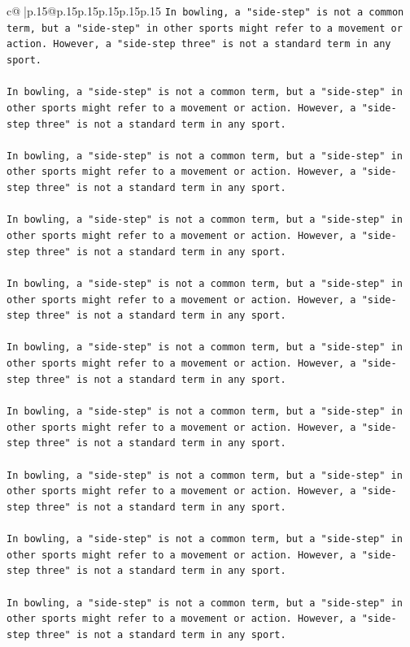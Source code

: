 \documentclass{article}
\begin{document}
{\begin{supertabular}{c@{$\;$}|p{.15\linewidth}@{}p{.15\linewidth}p{.15\linewidth}p{.15\linewidth}p{.15\linewidth}p{.15\linewidth}}
{{{\texttt{In bowling, a "side{-}step" is not a common term, but a "side{-}step" in other sports might refer to a movement or action. However, a "side{-}step three" is not a standard term in any sport. } \\
\\ 
\texttt{In bowling, a "side{-}step" is not a common term, but a "side{-}step" in other sports might refer to a movement or action. However, a "side{-}step three" is not a standard term in any sport. } \\
\\ 
\texttt{In bowling, a "side{-}step" is not a common term, but a "side{-}step" in other sports might refer to a movement or action. However, a "side{-}step three" is not a standard term in any sport. } \\
\\ 
\texttt{In bowling, a "side{-}step" is not a common term, but a "side{-}step" in other sports might refer to a movement or action. However, a "side{-}step three" is not a standard term in any sport. } \\
\\ 
\texttt{In bowling, a "side{-}step" is not a common term, but a "side{-}step" in other sports might refer to a movement or action. However, a "side{-}step three" is not a standard term in any sport. } \\
\\ 
\texttt{In bowling, a "side{-}step" is not a common term, but a "side{-}step" in other sports might refer to a movement or action. However, a "side{-}step three" is not a standard term in any sport. } \\
\\ 
\texttt{In bowling, a "side{-}step" is not a common term, but a "side{-}step" in other sports might refer to a movement or action. However, a "side{-}step three" is not a standard term in any sport. } \\
\\ 
\texttt{In bowling, a "side{-}step" is not a common term, but a "side{-}step" in other sports might refer to a movement or action. However, a "side{-}step three" is not a standard term in any sport. } \\
\\ 
\texttt{In bowling, a "side{-}step" is not a common term, but a "side{-}step" in other sports might refer to a movement or action. However, a "side{-}step three" is not a standard term in any sport. } \\
\\ 
\texttt{In bowling, a "side{-}step" is not a common term, but a "side{-}step" in other sports might refer to a movement or action. However, a "side{-}step three" is not a standard term in any sport. } \\
}}}
\end{supertabular}}
\end{document}
